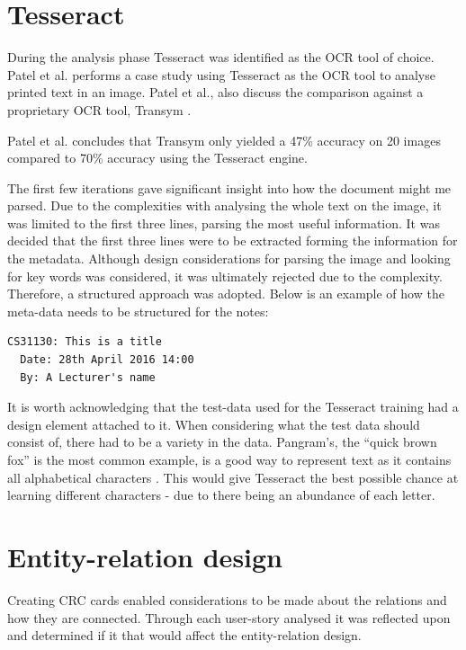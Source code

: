 \section{Tesseract}
During the analysis phase Tesseract was identified as the OCR tool of choice. Patel et al. \cite{citeulike:13920892} performs a case study using Tesseract as the OCR tool to analyse printed text in an image. Patel et al., also discuss the comparison against a proprietary OCR tool, Transym \cite{citeulike:14023819}.

Patel et al. concludes that Transym only yielded a 47\% accuracy on 20 images compared to 70\% accuracy using the Tesseract engine.

The first few iterations gave significant insight into how the document might me parsed. Due to the complexities with analysing the whole text on the image, it was limited to the first three lines, parsing the most useful information. It was decided that the first three lines were to be extracted forming the information for the metadata. Although design considerations for parsing the image and looking for key words was considered, it was ultimately rejected due to the complexity. Therefore, a structured approach was adopted. Below is an example of how the meta-data needs to be structured for the notes:

\begin{lstlisting}[caption={An example exert from a valid structured note}, label={lst:mock1}, breaklines, columns=fullflexible, basicstyle=\normalsize\ttfamily]
  CS31130: This is a title
  Date: 28th April 2016 14:00
  By: A Lecturer's name
\end{lstlisting}



It is worth acknowledging that the test-data used for the Tesseract training had a design element attached to it. When considering what the test data should consist of, there had to be a variety in the data. Pangram's, the ``quick brown fox'' is the most common example, is a good way to represent text as it contains all alphabetical characters \cite{citeulike:14023830}. This would give Tesseract the best possible chance at learning different characters - due to there being an abundance of each letter.

\section{Entity-relation design}\label{section:er_diagram}
Creating CRC cards enabled considerations to be made about the relations and how they are connected. Through each user-story analysed it was reflected upon and determined if it that would affect the entity-relation design.

